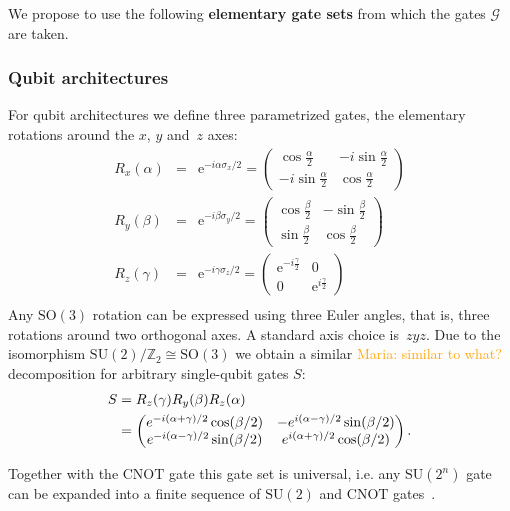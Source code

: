 \documentclass[aps,pra,10pt,twocolumn,groupedaddress,nofootinbib]{revtex4-1}
\theoremstyle{plain}
\newcommand{\isom}{\cong} %
\newcommand{\bpm}{\begin{pmatrix}}
\newcommand{\epm}{\end{pmatrix}}
\newcommand{\Z}{\ensuremath{\mathbb Z}}  %
\newcommand{\SO}{\text{SO}} %
\newcommand{\SU}{\text{SU}} %
\newcommand{\CNOT}{\text{CNOT}}
\newcommand{\e}{\mathrm{e}}
\newcommand{\maria}[1]{\textcolor{orange}{Maria: #1}}
\begin{document}
We propose to use the following \textbf{elementary gate sets} from which the gates $\mathcal{G}$ are taken.

\subsubsection{Qubit architectures}

For qubit architectures we define three parametrized gates,
the elementary rotations around the $x$, $y$ and~$z$ axes:
\begin{eqnarray*}
        R_x(\alpha) &=& \e^{-i\alpha \sigma_x/2} =
        \begin{pmatrix}
          \cos \frac{\alpha}{2} & -i \sin \frac{\alpha}{2}\\
          -i \sin \frac{\alpha}{2} & \cos \frac{\alpha}{2}
        \end{pmatrix}\\
        R_y(\beta) &=& \e^{-i\beta \sigma_y/2} =
        \begin{pmatrix}
          \cos \frac{\beta}{2} & -\sin \frac{\beta}{2}\\
          \sin \frac{\beta}{2} & \cos \frac{\beta}{2}
        \end{pmatrix}\\
        R_z(\gamma) &=& \e^{-i\gamma \sigma_z/2}=
        \begin{pmatrix}
          \e^{-i \frac{\gamma}{2}} & 0\\
          0 & \e^{i \frac{\gamma}{2}}
        \end{pmatrix}\\
\end{eqnarray*}
Any $\SO(3)$ rotation can be expressed using three Euler angles, that is, three rotations around two orthogonal axes. A standard axis choice is~$zyz$. Due to the isomorphism $\SU(2)/\Z_2 \isom \SO(3)$ we obtain a similar \maria{similar to what?} decomposition
for arbitrary single-qubit gates $S$:
\begin{align}
\label{eq:app:euler}
\notag
S &= R_z(\gamma) R_y(\beta) R_z(\alpha)\\
&=
\bpm
e^{-i(\alpha+\gamma)/2} \cos(\beta/2) & -e^{i(\alpha-\gamma)/2} \sin(\beta/2)\\
e^{-i(\alpha-\gamma)/2} \sin(\beta/2) &  e^{i(\alpha+\gamma)/2} \cos(\beta/2)
\epm.
\end{align}

Together with the $\CNOT$ gate this gate set is universal, i.e. any $\SU(2^n)$
gate can be expanded into a finite sequence of $\SU(2)$ and $\CNOT$ gates~\cite{barenco1995}.
\end{document}

